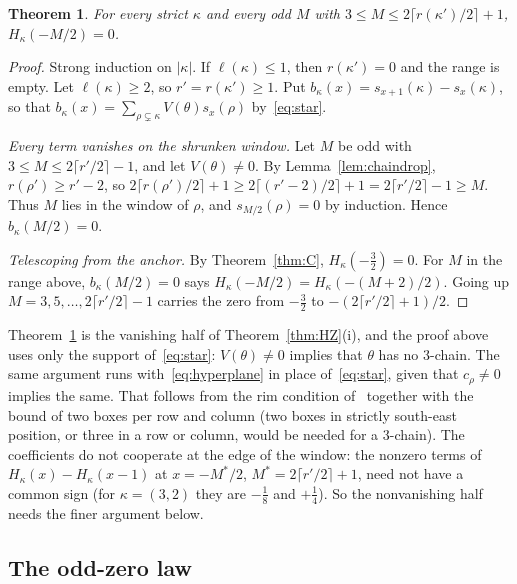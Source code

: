 \documentclass[11pt]{amsart}
\newtheorem{theorem}{Theorem}[section]
\theoremstyle{definition}
\theoremstyle{remark}
\begin{document}
\begin{theorem}\label{thm:Z}
For every strict $\kappa$ and every odd $M$ with $3\le M\le2\lceil r(\kappa')/2\rceil+1$,
$H_\kappa(-M/2)=0$.
\end{theorem}

\begin{proof}
Strong induction on $|\kappa|$. If $\ell(\kappa)\le1$, then $r(\kappa')=0$ and the range is
empty. Let $\ell(\kappa)\ge2$, so $r'=r(\kappa')\ge1$. Put $b_\kappa(x)=s_{x+1}(\kappa)-s_x(\kappa)$,
so that $b_\kappa(x)=\sum_{\rho\subsetneq\kappa}V(\theta)s_x(\rho)$ by~\eqref{eq:star}.

\emph{Every term vanishes on the shrunken window.} Let $M$ be odd with
$3\le M\le2\lceil r'/2\rceil-1$, and let $V(\theta)\ne0$. By Lemma~\ref{lem:chaindrop},
$r(\rho')\ge r'-2$, so
$2\lceil r(\rho')/2\rceil+1\ge2\lceil(r'-2)/2\rceil+1=2\lceil r'/2\rceil-1\ge M$. Thus $M$ lies
in the window of $\rho$, and $s_{M/2}(\rho)=0$ by induction. Hence $b_\kappa(M/2)=0$.

\emph{Telescoping from the anchor.} By Theorem~\ref{thm:C}, $H_\kappa(-\tfrac32)=0$. For $M$
in the range above, $b_\kappa(M/2)=0$ says $H_\kappa(-M/2)=H_\kappa(-(M+2)/2)$. Going up
$M=3,5,\dots,2\lceil r'/2\rceil-1$ carries the zero from $-\tfrac32$ to
$-(2\lceil r'/2\rceil+1)/2$.
\end{proof}

Theorem~\ref{thm:Z} is the vanishing half of Theorem~\ref{thm:HZ}(i), and the proof above
uses only the support of~\eqref{eq:star}: $V(\theta)\ne0$ implies that $\theta$ has no
$3$-chain. The same argument runs with~\eqref{eq:hyperplane} in place of~\eqref{eq:star}, given
that $c_\rho\ne0$ implies the same. That follows from the rim condition of~\cite[Thm.~5.5]{BR12}
together with the bound of two boxes per row and column (two boxes in strictly south-east
position, or three in a row or column, would be needed for a $3$-chain). The coefficients do not
cooperate at the edge of the window: the nonzero terms of $H_\kappa(x)-H_\kappa(x-1)$ at
$x=-M^*/2$, $M^*=2\lceil r'/2\rceil+1$, need not have a common sign (for
$\kappa=(3,2)$ they are $-\tfrac18$ and $+\tfrac14$). So the nonvanishing half needs the
finer argument below.

\subsection{The odd-zero law}
\end{document}
